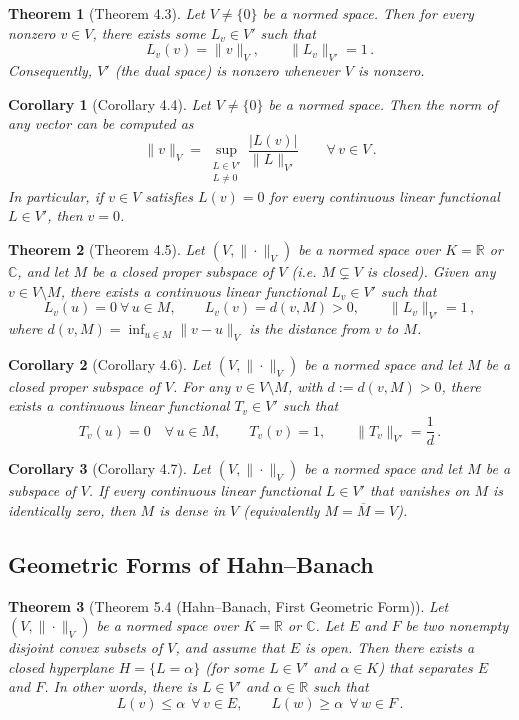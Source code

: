 \documentclass{article}
\theoremstyle{plain}
\newtheorem*{theorem*}{Theorem}
\newtheorem*{corollary*}{Corollary}
\begin{document}
\begin{theorem*}[Theorem 4.3]
Let $V \neq \{0\}$ be a normed space. Then for every nonzero $v \in V$, there exists some $L_v \in V'$ such that 
\[ 
L_v(v) = \|v\|_V, \qquad \|L_v\|_{V'} = 1\,.
\] 
Consequently, $V'$ (the dual space) is nonzero whenever $V$ is nonzero.
\end{theorem*}

\begin{corollary*}[Corollary 4.4]
Let $V \neq \{0\}$ be a normed space. Then the norm of any vector can be computed as 
\[ 
\|v\|_V = \sup_{\substack{L \in V' \\ L \neq 0}} \frac{|L(v)|}{\|L\|_{V'}} \qquad \forall\,v \in V\,.
\] 
In particular, if $v\in V$ satisfies $L(v) = 0$ for every continuous linear functional $L \in V'$, then $v=0$.
\end{corollary*}

\begin{theorem*}[Theorem 4.5]
Let $(V,\|\cdot\|_V)$ be a normed space over $K=\mathbb{R}$ or $\mathbb{C}$, and let $M$ be a closed proper subspace of $V$ (i.e. $M \subsetneq V$ is closed). Given any $v \in V \setminus M$, there exists a continuous linear functional $L_v \in V'$ such that 
\[ 
L_v(u) = 0 \ \forall\,u \in M, \qquad L_v(v) = d(v, M) > 0, \qquad \|L_v\|_{V'} = 1\,,
\] 
where $d(v,M) = \inf_{u\in M}\|v-u\|_V$ is the distance from $v$ to $M$.
\end{theorem*}

\begin{corollary*}[Corollary 4.6]
Let $(V,\|\cdot\|_V)$ be a normed space and let $M$ be a closed proper subspace of $V$. For any $v \in V\setminus M$, with $d := d(v,M) > 0$, there exists a continuous linear functional $T_v \in V'$ such that 
\[ 
T_v(u) = 0\quad \forall\,u \in M, \qquad T_v(v) = 1, \qquad \|T_v\|_{V'} = \frac{1}{d}\,.
\]
\end{corollary*}

\begin{corollary*}[Corollary 4.7]
Let $(V,\|\cdot\|_V)$ be a normed space and let $M$ be a subspace of $V$. If every continuous linear functional $L\in V'$ that vanishes on $M$ is identically zero, then $M$ is dense in $V$ (equivalently $M=\overline{M}=V$).
\end{corollary*}

\subsection*{Geometric Forms of Hahn–Banach}
\begin{theorem*}[Theorem 5.4 (Hahn–Banach, First Geometric Form)]
Let $(V,\|\cdot\|_V)$ be a normed space over $K=\mathbb{R}$ or $\mathbb{C}$. Let $E$ and $F$ be two nonempty disjoint convex subsets of $V$, and assume that $E$ is open. Then there exists a closed hyperplane $H = \{L = \alpha\}$ (for some $L\in V'$ and $\alpha \in K$) that separates $E$ and $F$. In other words, there is $L \in V'$ and $\alpha \in \mathbb{R}$ such that 
\[ 
L(v) \le \alpha \ \ \forall\,v \in E, \qquad L(w) \ge \alpha \ \ \forall\,w \in F\,.
\] 
\end{theorem*}
\end{document}
